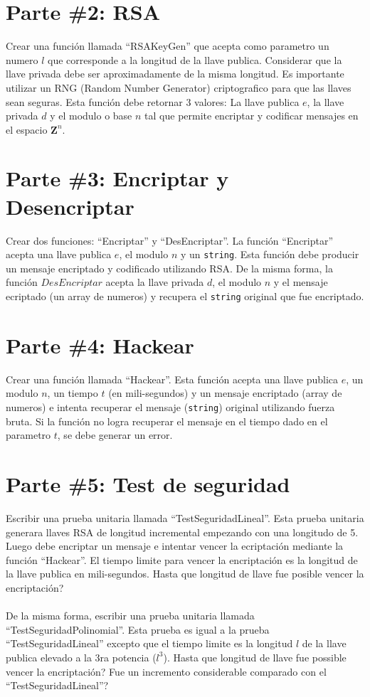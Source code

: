 \documentclass{article}
\begin{document}
\section*{Parte \#2: RSA}
Crear una funci\'on llamada ``RSAKeyGen'' que acepta como parametro
un numero $l$ que corresponde a la longitud de la llave publica.
Considerar que la llave privada debe ser aproximadamente de la misma
longitud. Es importante utilizar un RNG (Random Number Generator)
criptografico para que las llaves sean seguras. Esta funci\'on debe
retornar 3 valores: La llave publica $e$, la llave privada $d$ y el
modulo o base $n$ tal que permite encriptar y codificar mensajes
en el espacio $\mathbf{Z}^n$.

\section*{Parte \#3: Encriptar y Desencriptar}

Crear dos funciones: ``Encriptar'' y ``DesEncriptar''. La funci\'on
``Encriptar'' acepta una llave publica $e$, el modulo $n$ y un \texttt{string}.
Esta funci\'on debe producir un mensaje encriptado y codificado utilizando RSA.
De la misma forma, la funci\'on $DesEncriptar$ acepta la llave privada $d$,
el modulo $n$ y el mensaje ecriptado (un array de numeros) y recupera el \texttt{string}
original que fue encriptado.

\section*{Parte \#4: Hackear}

Crear una funci\'on llamada ``Hackear''. Esta funci\'on acepta una llave
publica $e$, un modulo $n$, un tiempo $t$ (en mili-segundos) y un mensaje encriptado (array de numeros) e intenta
recuperar el mensaje (\texttt{string}) original utilizando fuerza bruta. Si la funci\'on
no logra recuperar el mensaje en el tiempo dado en el parametro $t$, se debe
generar un error.

\section*{Parte \#5: Test de seguridad}
Escribir una prueba unitaria llamada ``TestSeguridadLineal''. Esta prueba unitaria
generara llaves RSA de longitud incremental empezando con una longitudo de 5. Luego debe encriptar un mensaje
e intentar vencer la ecriptaci\'on mediante la funci\'on ``Hackear''. El tiempo
limite para vencer la encriptaci\'on es la longitud de la llave publica en mili-segundos.
Hasta que longitud de llave fue posible vencer la encriptaci\'on?
\\\\
De la misma forma, escribir una prueba unitaria llamada ``TestSeguridadPolinomial''.
Esta prueba es igual a la prueba ``TestSeguridadLineal'' excepto que el tiempo limite
es la longitud $l$ de la llave publica elevado a la 3ra potencia ($l^3$). Hasta
que longitud de llave fue possible vencer la encriptaci\'on? Fue un incremento considerable
comparado con el ``TestSeguridadLineal''?
\end{document}
